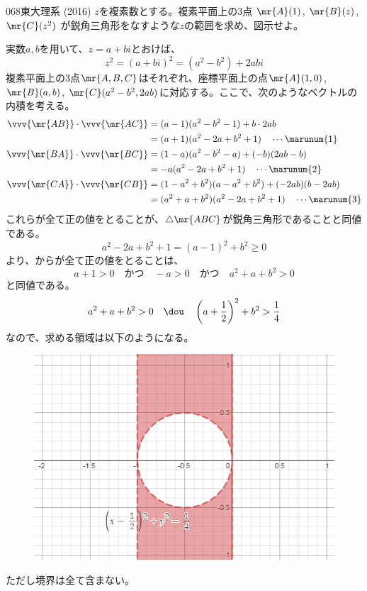 \begin{thm}{068}{}{東大理系 (2016)}
 $z$を複素数とする。複素平面上の3点 $\mr{A}(1)$, $\mr{B}(z)$, $\mr{C}(z^2)$ が鋭角三角形をなすような$z$の範囲を求め、図示せよ。
\end{thm}

実数$a, b$を用いて、$z=a+bi$とおけば、
\[ z^2=(a+bi)^2=(a^2-b^2)+2abi \]
複素平面上の3点$\mr{A, B, C}$はそれぞれ、座標平面上の点$\mr{A}(1, 0)$, $\mr{B}(a, b)$, $\mr{C}(a^2-b^2,2ab)$に対応する。ここで、次のようなベクトルの内積を考える。
\begin{align*}
 \vvv{\mr{AB}}\cdot\vvv{\mr{AC}}&=(a-1)(a^2-b^2-1)+b\cdot 2ab \\
 &=(a+1)(a^2-2a+b^2+1) \quad\cdots\marunum{1} \\
 \vvv{\mr{BA}}\cdot\vvv{\mr{BC}}&=(1-a)(a^2-b^2-a)+(-b)(2ab-b) \\
 &=-a(a^2-2a+b^2+1) \quad\cdots\marunum{2} \\
 \vvv{\mr{CA}}\cdot\vvv{\mr{CB}}&=(1-a^2+b^2)(a-a^2+b^2)+(-2ab)(b-2ab) \\
 &=(a^2+a+b^2)(a^2-2a+b^2+1) \quad\cdots\marunum{3}
\end{align*}
これらが全て正の値をとることが、$\triangle\mr{ABC}$が鋭角三角形であることと同値である。
\[ a^2-2a+b^2+1=(a-1)^2+b^2\ge 0 \]
より、からが全て正の値をとることは、
\[ a+1>0 \quad\text{かつ}\quad -a>0 \quad\text{かつ}\quad a^2+a+b^2>0 \]
と同値である。
\[ a^2+a+b^2>0 \quad\dou\quad \left(a+\frac{1}{2}\right)^2+b^2>\frac{1}{4} \]
なので、求める領域は以下のようになる。
\begin{figure}[H]
 \centering
 \includegraphics[width=0.7\linewidth]{../problems/Q_068/A_068.png}
\end{figure}
ただし境界は全て含まない。